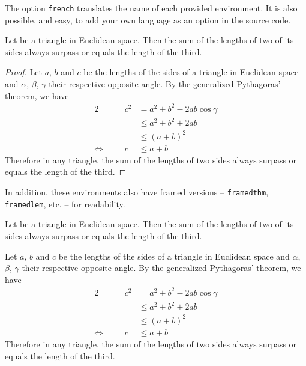 \documentclass[a4paper, 12pt]{report}
\begin{document}
    \begin{note}
        The option \texttt{french} translates the name of each provided environment. It is also possible, and easy, to add your own language as an option in the source code.
    \end{note}

    \begin{thm}
        Let be a triangle in Euclidean space. Then the sum of the lengths of two of its sides always surpass or equals the length of the third.
    \end{thm}

    \begin{proof}
        Let $a$, $b$ and $c$ be the lengths of the sides of a triangle in Euclidean space and $\alpha$, $\beta$, $\gamma$ their respective opposite angle. By the generalized Pythagoras' theorem, we have
        \begin{alignat*}{2}
                                  &  & c^2 & = a^2 + b^2 - 2ab \cos\gamma \\
                                  &  &     & \leq a^2 + b^2 + 2ab         \\
                                  &  &     & \leq (a + b)^2               \\
            \Leftrightarrow \quad &  & c   & \leq a + b
        \end{alignat*}
        Therefore in any triangle, the sum of the lengths of two sides always surpass or equals the length of the third.
    \end{proof}

    In addition, these environments also have framed versions -- \texttt{framedthm}, \texttt{framedlem}, etc. -- for readability.

    \begin{framedthm}\label{thm:Triangle inequality}
        Let be a triangle in Euclidean space. Then the sum of the lengths of two of its sides always surpass or equals the length of the third.
    \end{framedthm}

    \begin{framedprf}
        Let $a$, $b$ and $c$ be the lengths of the sides of a triangle in Euclidean space and $\alpha$, $\beta$, $\gamma$ their respective opposite angle. By the generalized Pythagoras' theorem, we have
        \begin{alignat*}{2}
                                  &  & c^2 & = a^2 + b^2 - 2ab \cos\gamma \\
                                  &  &     & \leq a^2 + b^2 + 2ab         \\
                                  &  &     & \leq (a + b)^2               \\
            \Leftrightarrow \quad &  & c   & \leq a + b
        \end{alignat*}
        Therefore in any triangle, the sum of the lengths of two sides always surpass or equals the length of the third. \qedadd
    \end{framedprf}
\end{document}
